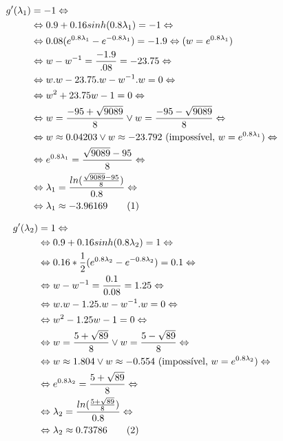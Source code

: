\documentclass[a4paper, 18pt]{article}
\begin{document}
	\begin{align*} %
		g'(\lambda_1) &= -1 \Leftrightarrow \\ &\Leftrightarrow
		0.9 + 0.16sinh(0.8\lambda_1) = -1 \Leftrightarrow \\ &\Leftrightarrow
		0.08(e^{0.8\lambda_1} - e^{-0.8\lambda_1}) = -1.9 \Leftrightarrow (w = e^{0.8\lambda_1}) \\ &\Leftrightarrow
		w - w^{-1} = \frac{-1.9}{.08} = -23.75 \Leftrightarrow \\ &\Leftrightarrow
		w.w - 23.75.w - w^{-1}.w = 0 \Leftrightarrow \\ &\Leftrightarrow
		w^2 + 23.75w - 1 = 0 \Leftrightarrow \\ &\Leftrightarrow
		w = \frac{-95 + \sqrt{9089}}{8} \vee w = \frac{-95 - \sqrt{9089}}{8} \Leftrightarrow \\ &\Leftrightarrow
		w \approx 0.04203 \vee w \approx -23.792 \text{  (impossível, $w = e^{0.8\lambda_1}$)} \Leftrightarrow \\ &\Leftrightarrow
		e^{0.8\lambda_1} = \frac{\sqrt{9089} - 95}{8} \Leftrightarrow \\ &\Leftrightarrow
		\lambda_1 = \frac{ln(\frac{\sqrt{9089} - 95}{8})}{0.8} \Leftrightarrow \\ &\Leftrightarrow
		\lambda_1 \approx -3.96169 \stepcounter{equation}\tag{\theequation}\label{lambda1}
	\end{align*}


	\begin{align*}
		g'(\lambda_2) &= 1 \Leftrightarrow \\ &\Leftrightarrow
		0.9 + 0.16sinh(0.8\lambda_2) = 1 \Leftrightarrow \\ &\Leftrightarrow
		0.16 * \frac{1}{2}(e^{0.8\lambda_2} - e^{-0.8\lambda_2}) = 0.1 \Leftrightarrow \\ &\Leftrightarrow
		w - w^{-1} = \frac{0.1}{0.08} = 1.25 \Leftrightarrow \\ &\Leftrightarrow
		w.w - 1.25.w - w^{-1}.w = 0 \Leftrightarrow \\ &\Leftrightarrow
		w^2 - 1.25w - 1 = 0 \Leftrightarrow \\ &\Leftrightarrow
		w = \frac{5 + \sqrt{89}}{8} \vee w = \frac{5 - \sqrt{89}}{8} \Leftrightarrow \\ &\Leftrightarrow
		w \approx 1.804 \vee w \approx -0.554 \text{  (impossível, $w = e^{0.8\lambda_2}$)} \Leftrightarrow \\ &\Leftrightarrow
		e^{0.8\lambda_2} = \frac{5 + \sqrt{89}}{8} \Leftrightarrow \\ &\Leftrightarrow
		\lambda_2 = \frac{ln(\frac{5 + \sqrt{89}}{8})}{0.8} \Leftrightarrow \\ &\Leftrightarrow
		\lambda_2 \approx 0.73786 \stepcounter{equation}\tag{\theequation}\label{lambda2}
	\end{align*}
\end{document}
